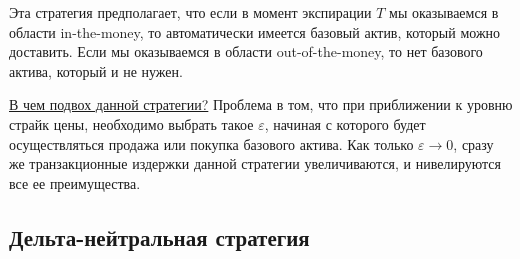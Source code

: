\documentclass{article}
\begin{document}
 Эта стратегия предполагает, что если в момент экспирации $T$ мы оказываемся в области in-the-money, то автоматически имеется базовый актив, который можно доставить. Если мы оказываемся в области out-of-the-money, то нет базового актива, который и не нужен.
 
\underline{В чем подвох данной стратегии?} Проблема в том, что при приближении к уровню страйк цены, необходимо выбрать такое $\varepsilon$, начиная с которого будет осуществляться продажа или покупка базового актива. Как только $\varepsilon \rightarrow 0$, сразу же транзакционные издержки данной стратегии увеличиваются, и нивелируются все ее преимущества.


\subsection{Дельта-нейтральная стратегия}
\end{document}
